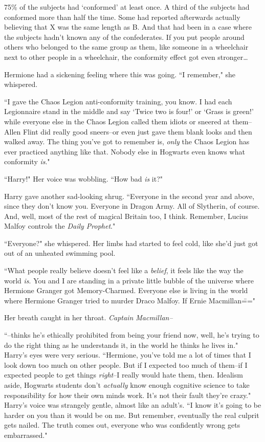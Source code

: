 75\% of the subjects had `conformed' at least once. A third of the subjects had conformed more than half the time. Some had reported afterwards actually believing that X was the same length as B\@. And that had been in a case where the subjects hadn't known any of the confederates. If you put people around others who belonged to the same group as them, like someone in a wheelchair next to other people in a wheelchair, the conformity effect got even stronger{\ldots}

Hermione had a sickening feeling where this was going. ``I remember," she whispered.

``I gave the Chaos Legion anti-conformity training, you know. I had each Legionnaire stand in the middle and say `Twice two is four!' or `Grass is green!' while everyone else in the Chaos Legion called them idiots or sneered at them\---Allen Flint did really good sneers\---or even just gave them blank looks and then walked away. The thing you've got to remember is, \emph{only} the Chaos Legion has ever practiced anything like that. Nobody else in Hogwarts even knows what conformity \emph{is}."

``Harry!" Her voice was wobbling. ``How bad \emph{is} it?"

Harry gave another sad-looking shrug. ``Everyone in the second year and above, since they don't know you. Everyone in Dragon Army. All of Slytherin, of course. And, well, most of the rest of magical Britain too, I think. Remember, Lucius Malfoy controls the \emph{Daily Prophet}."

``Everyone?" she whispered. Her limbs had started to feel cold, like she'd just got out of an unheated swimming pool.

``What people really believe doesn't feel like a \emph{belief}, it feels like the way the world \emph{is}. You and I are standing in a private little bubble of the universe where Hermione Granger got Memory-Charmed. Everyone else is living in the world where Hermione Granger tried to murder Draco Malfoy. If Ernie Macmillan\==="

Her breath caught in her throat. \emph{Captain Macmillan\---}

``\---thinks he's ethically prohibited from being your friend now, well, he's trying to do the right thing as he understands it, in the world he thinks he lives in." Harry's eyes were very serious. ``Hermione, you've told me a lot of times that I look down too much on other people. But if I expected too much of them\---if I expected people to get things \emph{right}\---I really would hate them, then. Idealism aside, Hogwarts students don't \emph{actually} know enough cognitive science to take responsibility for how their own minds work. It's not their fault they're crazy." Harry's voice was strangely gentle, almost like an adult's. ``I know it's going to be harder on you than it would be on me. But remember, eventually the real culprit gets nailed. The truth comes out, everyone who was confidently wrong gets embarrassed."

